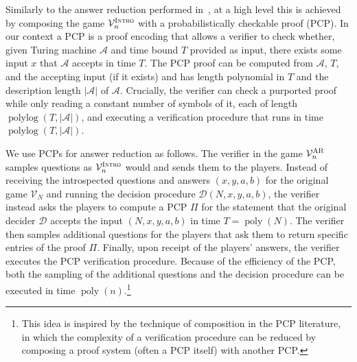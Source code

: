 \documentclass[11pt]{article}
\theoremstyle{definition}
\DeclareMathOperator{\poly}{poly}
\DeclareMathOperator{\polylog}{polylog}
\newcommand{\decider}{\mathcal{D}}
\newcommand{\verifier}{\mathcal{V}}
\newcommand{\gamestyle}[1]{\ensuremath{\textsc{#1}}\xspace}
\newcommand{\ar}{\gamestyle{AR}}
\newcommand{\intro}{\gamestyle{Intro}}
\renewcommand{\cal}[1]{\mathcal{#1}}
\begin{document}
Similarly to the answer reduction performed in~\cite{NW19}, at a high level this is achieved by composing the game $\verifier^\intro_n$ with a probabilistically checkable proof (PCP). In our context a PCP is a proof encoding that allows a verifier to check whether, given Turing machine $\cal{A}$ and time bound $T$ provided as input, there exists some input $x$ that $\cal{A}$ accepts in time $T$. The PCP proof can be computed from $\cal{A}$, $T$, and the accepting input (if it exists) and has length polynomial in $T$ and the description length $|\cal{A}|$ of $\cal{A}$. Crucially, the verifier can check a purported proof while only reading a constant number of symbols of it, each of length $\polylog(T,|\cal{A}|)$, and executing a verification procedure that runs in time $\polylog(T,|\cal{A}|)$. 

We use PCPs for answer reduction as follows. The verifier in the game $\verifier^\ar_n$ samples questions as $\verifier^\intro_n$ would and sends them to the players. Instead of receiving the introspected questions and answers $(x,y,a,b)$ for the original game $\verifier_N$ and running the decision procedure $\decider(N,x,y,a,b)$, the verifier instead asks the players to compute a PCP $\Pi$ for the statement that the original decider $\decider$ accepts the input $(N,x,y,a,b)$ in time $T=\poly(N)$. The verifier then samples additional questions for the players that ask them to return specific entries of the proof $\Pi$. Finally, upon receipt of the players' answers, the verifier executes the PCP verification procedure. Because of the efficiency of the PCP, both the sampling of the additional questions and the decision procedure can be executed in time $\poly(n)$.\footnote{This idea is inspired by the technique of composition in the PCP literature, in which the complexity of a verification procedure can be reduced by composing a proof system (often a PCP itself) with another PCP.}
\end{document}
